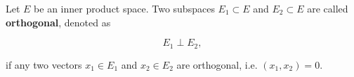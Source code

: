 Let $E$ be an inner product space. Two subspaces $E_1 \subset E$ and $E_2 \subset E$ are called \textbf{orthogonal}, denoted as

$$E_1 \perp E_2,$$

if any two vectors $x_1 \in E_1$ and $x_2 \in E_2$ are orthogonal, i.e. $(x_1, x_2) = 0$.
